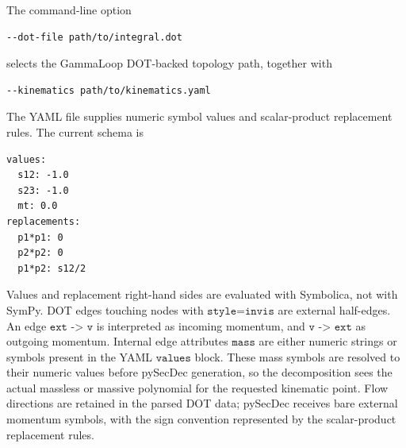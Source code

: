 \documentclass[11pt]{article}
\begin{document}
The command-line option
\begin{lstlisting}[style=fsdcode]
--dot-file path/to/integral.dot
\end{lstlisting}
selects the GammaLoop DOT-backed topology path, together with
\begin{lstlisting}[style=fsdcode]
--kinematics path/to/kinematics.yaml
\end{lstlisting}
The YAML file supplies numeric symbol values and scalar-product replacement
rules.  The current schema is
\begin{lstlisting}[style=fsdcode]
values:
  s12: -1.0
  s23: -1.0
  mt: 0.0
replacements:
  p1*p1: 0
  p2*p2: 0
  p1*p2: s12/2
\end{lstlisting}
Values and replacement right-hand sides are evaluated with Symbolica, not with
SymPy.  DOT edges touching nodes with \(\texttt{style=invis}\) are external
half-edges.  An edge \(\texttt{ext -> v}\) is interpreted as incoming
momentum, and \(\texttt{v -> ext}\) as outgoing momentum.  Internal edge
attributes \(\texttt{mass}\) are either numeric strings or symbols present in
the YAML \(\texttt{values}\) block.  These mass symbols are resolved to their
numeric values before pySecDec generation, so the decomposition sees the
actual massless or massive polynomial for the requested kinematic point.
Flow directions are retained in the parsed DOT data; pySecDec receives bare
external momentum symbols, with the sign convention represented by the
scalar-product replacement rules.
\end{document}
